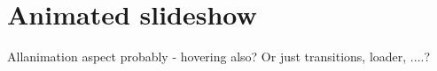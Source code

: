 %
%
% 
% 
% 


\chapter{Animated slideshow}

\label{chap:animated}

Allanimation aspect probably - hovering also? Or just transitions, loader, ....?